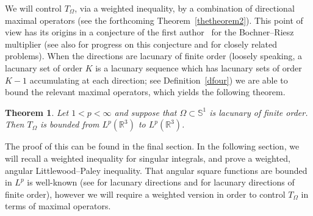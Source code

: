 \documentclass[11pt]{amsart}
\newtheorem{theorem}{Theorem}[section]
\theoremstyle{definition}
\theoremstyle{remark}
\begin{document}
 We will control $T_{\Omega}$, via a weighted inequality, by a combination of directional
maximal operators (see the forthcoming Theorem~\ref{thetheorem2}).
This point of view has its origins in a conjecture of the first
author~\cite{C1} for the Bochner--Riesz multiplier (see also
\cite{steinwilliams,C2,Ca,CaS,Ch,LRS} for progress on this conjecture and \cite{CRF1,Ca2,B1,B2,B0} 
for closely related problems). When the directions
are lacunary of finite order (loosely speaking, a lacunary set of
order $K$ is a lacunary sequence which has lacunary sets of order
$K-1$ accumulating at each direction; see Definition~\ref{dfour}) we are able to bound the relevant maximal
operators, which yields the following theorem.

\begin{theorem}\label{thetheorem} Let $1<p<\infty$ and suppose that $\Omega\subset\mathbb{S}^1$ is lacunary of finite order. Then $T_{\Omega}$ is bounded from $L^p(\mathbb{R}^3)$ to $L^p(\mathbb{R}^3)$.
\end{theorem}

The proof of this can be found in the final section. In the
following section, we will recall a weighted inequality for singular
integrals, and prove a weighted, angular
Littlewood--Paley inequality. That angular square functions are
bounded in $L^p$ is well-known (see \cite{CRF1,NSW} for lacunary
directions and \cite{SS} for lacunary directions of finite order),
however we will require a weighted version in order to control
$T_{\Omega}$ in terms of maximal operators.
\end{document}
